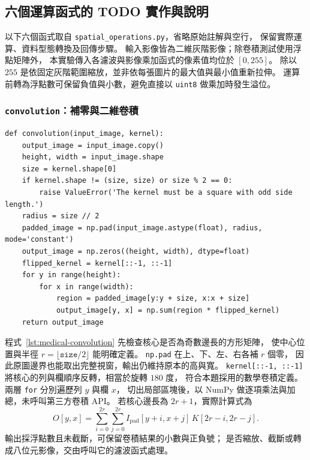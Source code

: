 \subsection{六個運算函式的 TODO 實作與說明}
\label{sec:medical-implementation}

以下六個函式取自 \texttt{spatial\_operations.py}，省略原始註解與空行，
保留實際運算、資料型態轉換及回傳步驟。
輸入影像皆為二維灰階影像；除卷積測試使用浮點矩陣外，
本實驗傳入各濾波與影像乘加函式的像素值均位於 $[0,255]$。
除以 $255$ 是依固定灰階範圍縮放，並非依每張圖片的最大值與最小值重新拉伸。
運算前轉為浮點數可保留負值與小數，避免直接以 \texttt{uint8} 做乘加時發生溢位。

\subsubsection{\textnormal{\texttt{convolution}}：補零與二維卷積}

\noindent\begin{minipage}{\linewidth}
\begin{lstlisting}[caption={自行實作補零與兩層迴圈卷積},label={lst:medical-convolution}]
def convolution(input_image, kernel):
    output_image = input_image.copy()
    height, width = input_image.shape
    size = kernel.shape[0]
    if kernel.shape != (size, size) or size % 2 == 0:
        raise ValueError('The kernel must be a square with odd side length.')
    radius = size // 2
    padded_image = np.pad(input_image.astype(float), radius, mode='constant')
    output_image = np.zeros((height, width), dtype=float)
    flipped_kernel = kernel[::-1, ::-1]
    for y in range(height):
        for x in range(width):
            region = padded_image[y:y + size, x:x + size]
            output_image[y, x] = np.sum(region * flipped_kernel)
    return output_image
\end{lstlisting}
\end{minipage}\par

程式~\ref{lst:medical-convolution} 先檢查核心是否為奇數邊長的方形矩陣，
使中心位置與半徑 $r=\lfloor\texttt{size}/2\rfloor$ 能明確定義。
\texttt{np.pad} 在上、下、左、右各補 $r$ 個零，
因此原圖邊界也能取出完整視窗，輸出仍維持原本的高與寬。
\texttt{kernel[::-1, ::-1]} 將核心的列與欄順序反轉，相當於旋轉 $180$ 度，
符合本題採用的數學卷積定義。
兩層 \texttt{for} 分別遍歷列 $y$ 與欄 $x$，
切出局部區塊後，以 NumPy 做逐項乘法與加總，未呼叫第三方卷積 API。
若核心邊長為 $2r+1$，實際計算式為
\begin{equation}
  O[y,x]=\sum_{i=0}^{2r}\sum_{j=0}^{2r}
  I_{\mathrm{pad}}[y+i,x+j]\,K[2r-i,2r-j].
  \label{eq:medical-convolution}
\end{equation}
輸出採浮點數且未截斷，可保留卷積結果的小數與正負號；
是否縮放、截斷或轉成八位元影像，交由呼叫它的濾波函式處理。

